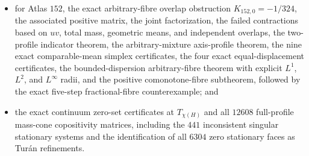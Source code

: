 \documentclass[11pt]{article}
\begin{document}
\begin{itemize}
  coefficients on all four rows;
 \item for Atlas $152$, the exact arbitrary-fibre overlap obstruction
 $K_{152,0}=-1/324$, the associated positive matrix, the joint
 factorization, the failed contractions based on $uv$, total mass,
 geometric means, and independent overlaps, the two-profile indicator theorem,
 the arbitrary-mixture axis-profile theorem, the nine exact comparable-mean
 simplex certificates, the four exact equal-displacement certificates, the
 bounded-dispersion arbitrary-fibre theorem with
 explicit $L^1$, $L^2$, and $L^\infty$ radii, and the positive
 comonotone-fibre subtheorem, followed by the exact five-step
 fractional-fibre counterexample;
 and
 \item the exact continuum zero-set certificates at $T_{\chi(H)}$ and all
 $12608$ full-profile mass-cone copositivity matrices, including the $441$
 inconsistent singular stationary systems and the identification of all
 $6304$ zero stationary faces as Tur\'an refinements.
\end{itemize}
\end{document}
